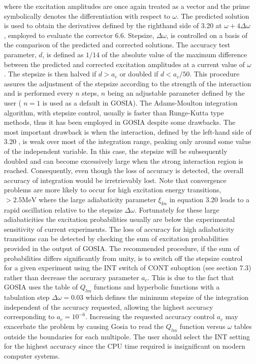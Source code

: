 \documentclass[10pt]{article}
\begin{document}
where the excitation amplitudes are once again treated as a vector and the prime symbolically denotes the differentiation with respect to $\omega$. The predicted solution is used to obtain the derivatives defined by the righthand side of 3.20 at $\omega+4 \Delta \omega$, employed to evaluate the corrector 6.6. Stepsize, $\Delta \omega$, is controlled on a basis of the comparison of the predicted and corrected solutions. The accuracy test parameter, $d$, is defined as $1 / 14$ of the absolute value of the maximum difference between the predicted and corrected excitation amplitudes at a current value of $\omega$. The stepsize is then halved if $d>a_{c}$ or doubled if $d<a_{c} / 50$. This procedure assures the adjustment of the stepsize according to the strength of the interaction and is performed every $n$ steps, $n$ being an adjustable parameter defined by the user ( $n=1$ is used as a default in GOSIA). The Adams-Moulton integration algorithm, with stepsize control, usually is faster than Runge-Kutta type methods, thus it has been employed in GOSIA despite some drawbacks. The most important drawback is when the interaction, defined by the left-hand side of 3.20 , is weak over most of the integration range, peaking only around some value of the independent variable. In this case, the stepsize will be subsequently doubled and can become excessively large when the strong interaction region is reached. Consequently, even though the loss of accuracy is detected, the overall accuracy of integration would be irretrievably lost. Note that convergence problems are more likely to occur for high excitation energy transitions, $>2.5 \mathrm{MeV}$ where the large adiabaticity parameter $\xi_{k n}$ in equation 3.20 leads to a rapid oscillation relative to the stepsize $\Delta \omega$. Fortunately for these large adiabaticities the excitation probabilities usually are below the experimental sensitivity of current experiments. The loss of accuracy for high adiabaticity transitions can be detected by checking the sum of excitation probabilities provided in the output of GOSIA. The recommended procedure, if the sum of probabilities differs significantly from unity, is to switch off the stepsize control for a given experiment using the INT switch of CONT suboption (see section 7.3) rather than decrease the accuracy parameter $a_{c}$. This is due to the fact that GOSIA uses the table of $Q_{l m}$ functions and hyperbolic functions with a tabulation step $\Delta \omega=0.03$ which defines the minimum stepsize of the integration independent of the accuracy requested, allowing the highest accuracy corresponding to $a_{c}=10^{-6}$. Increasing the requested accuracy control $a_{c}$ may exacerbate the problem by causing Gosia to read the $Q_{l m}$ function versus $\omega$ tables outside the boundaries for each multipole. The user should select the INT setting for the highest accuracy since the CPU time required is insignificant on modern computer systems.
\end{document}
